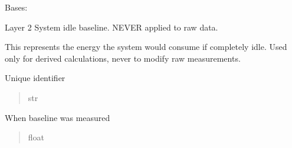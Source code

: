 \documentclass[letterpaper,10pt,english]{sphinxmanual}
\begin{document}
\begin{fulllineitems}
\label{\detokenize{core.models.baseline_measurement:core.models.baseline_measurement.BaselineMeasurement}}
\pysigstartsignatures
\pysiglinewithargsret
{}
{}
{}
\pysigstopsignatures
\sphinxAtStartPar
Bases: 

\sphinxAtStartPar
Layer 2 \textendash{} System idle baseline. NEVER applied to raw data.

\sphinxAtStartPar
This represents the energy the system would consume if completely idle.
Used only for derived calculations, never to modify raw measurements.

\begin{fulllineitems}
\label{\detokenize{core.models.baseline_measurement:core.models.baseline_measurement.BaselineMeasurement.baseline_id}}
\pysigstartsignatures
\pysigline
{}
\pysigstopsignatures
\sphinxAtStartPar
Unique identifier
\begin{quote}\begin{description}
\sphinxAtStartPar
str

\end{description}\end{quote}

\end{fulllineitems}


\begin{fulllineitems}
\label{\detokenize{core.models.baseline_measurement:core.models.baseline_measurement.BaselineMeasurement.timestamp}}
\pysigstartsignatures
\pysigline
{}
\pysigstopsignatures
\sphinxAtStartPar
When baseline was measured
\begin{quote}\begin{description}
\sphinxAtStartPar
float


\end{description}
\end{quote}
\end{fulllineitems}
\end{fulllineitems}
\end{document}
